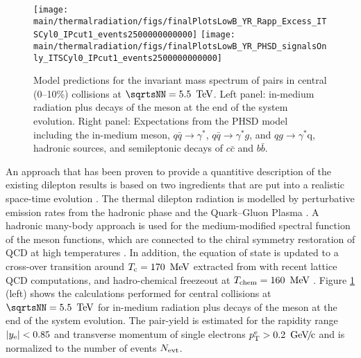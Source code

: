 \documentclass[../report.tex]{subfiles}
\providecommand{\main}{..}
\begin{document}
\begin{figure}[htb]
\centering
\texttt{[image: \\main/thermalradiation/figs/finalPlotsLowB\_YR\_Rapp\_Excess\_ITSCyl0\_IPcut1\_events2500000000000]}
\texttt{[image: \\main/thermalradiation/figs/finalPlotsLowB\_YR\_PHSD\_signalsOnly\_ITSCyl0\_IPcut1\_events2500000000000]}
\caption{Model predictions for the invariant mass spectrum of \Pepem pairs in central (0--10\%) \PbPb{} collisions at $\sqrtsNN = \unit[5.5]{\UTeV}$. Left panel: in-medium radiation plus decays of the \PGr meson at the end of the system evolution. Right panel: Expectations from the PHSD model including the in-medium \PGr meson, $q\bar{q}\rightarrow\gamma^{*}$, $q\bar{q}\rightarrow\gamma^{*}g$, and $qg\rightarrow\gamma^{*}$q, hadronic sources, and semileptonic decays of $c\bar{c}$ and $b\bar{b}$.}
\label{fig:LHCExpectations_Rapp_pHSD}
\end{figure}

An approach that has been proven to provide a quantitive description of the existing dilepton results \cite{Rapp:2011is} is based on two ingredients that are put into a realistic space-time evolution \cite{Rapp:2000pe}. The thermal dilepton radiation is modelled by perturbative emission rates from the hadronic phase and the Quark--Gluon Plasma \cite{vanHees:2007th,Rapp:2009yu}. A hadronic many-body approach \cite{Rapp:1999us} is used for the medium-modified spectral function of the \PGr meson functions, which are connected to the chiral symmetry restoration of QCD at high temperatures \cite{Hohler:2013eba}. In addition, the equation of state is updated to a cross-over transition around $T_{\rm c}=\unit[170]{\UMeV}$ extracted from with recent lattice QCD computations, and hadro-chemical freezeout at $T_{\rm chem}=\unit[160]{\UMeV}$ \cite{He:2011zx}. Figure \ref{fig:LHCExpectations_Rapp_pHSD} (left) shows the calculations performed for central \PbPb{} collisions at $\sqrtsNN = \unit[5.5]{\UTeV}$ for in-medium radiation plus decays of the \PGr meson at the end of the system evolution. The pair-yield is estimated for the rapidity range $|y_{\rm e}|<0.85$ and transverse momentum of single electrons $\pT^{\rm e}>\unit[0.2]{\UGeVc}$ and is normalized to the number of events $N_{\rm evt}$. 
 
\end{document}
